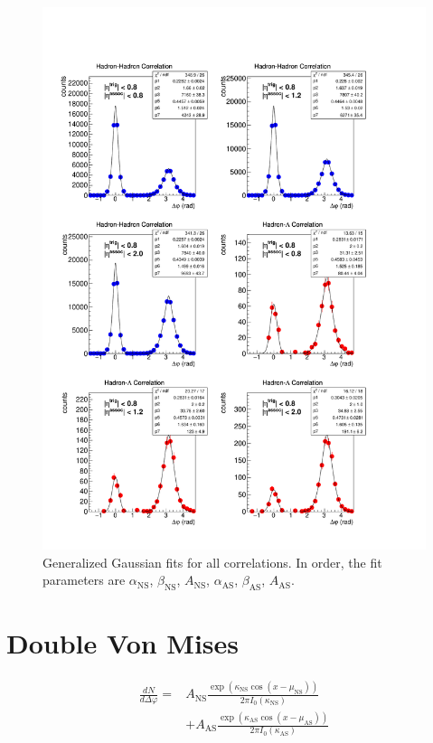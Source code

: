 \documentclass[../main.tex]{subfiles}
\begin{document}
\begin{figure}
    \centering
    \includegraphics[scale=0.75]{appendix/figs/gen_gaussian_fit.pdf}
    \caption{Generalized Gaussian fits for all correlations. In order, the fit parameters are $\alpha_{\text{NS}}$, $\beta_{\text{NS}}$, $A_{\text{NS}}$, $\alpha_{\text{AS}}$, $\beta_{\text{AS}}$, $A_{\text{AS}}$.}
    \label{fig:gen_gaussian_fits}
\end{figure}


\clearpage
\section{Double Von Mises}

\begin{align}
    \frac{dN}{d\Delta\varphi} =& A_{\text{NS}}\frac{\exp{(\kappa_{\text{NS}} \cos{(x-\mu_{\text{NS}})})}}{2\pi I_0(\kappa_\text{NS})} \\
    &+ A_{\text{AS}} \frac{\exp{(\kappa_{\text{AS}} \cos{(x-\mu_{\text{AS}})})}}{2\pi I_0(\kappa_\text{AS})}
\end{align}
\end{document}
